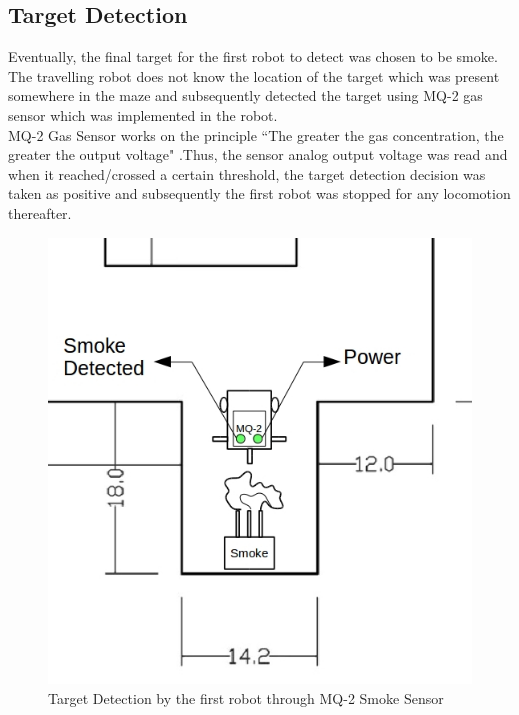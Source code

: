 \subsection{Target Detection}
Eventually, the final target for the first robot to detect was chosen to be smoke.  The travelling robot does not know the location of the target which was present somewhere in the maze and subsequently detected the target using MQ-2 gas sensor which was implemented in the robot. \\
MQ-2 Gas Sensor works on the principle “The greater the gas concentration, the greater the output voltage" .Thus, the sensor analog output voltage was read and when it reached/crossed a certain threshold, the target detection decision was taken as positive and subsequently the first robot was stopped for any locomotion thereafter.
\begin{figure}[h]
\center
\includegraphics[scale=0.5]{part4_1_final.jpg} 
\caption{Target Detection by the first robot through MQ-2 Smoke Sensor}
\end{figure}
